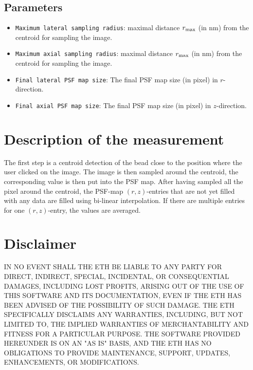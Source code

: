 \documentclass{scrartcl}
\begin{document}
\subsection{Parameters} 
\begin{itemize}
\item \texttt{Maximum lateral sampling radius}: maximal distance $r_{\textnormal{max}}$ (in nm) from the centroid for sampling the image.
\item \texttt{Maximum axial sampling radius}: maximal distance $r_{\textnormal{max}}$ (in nm) from the centroid for sampling the image.
\item \texttt{Final lateral PSF map size}: The final PSF map size (in pixel) in $r$-direction.
\item \texttt{Final axial PSF map size}: The final PSF map size (in pixel) in $z$-direction.
\end{itemize}

\section{Description of the measurement}
The first step is a centroid detection \cite{sbalzarini} of the bead close to the position where the user clicked on the image. 
The image is then sampled around the centroid, the corresponding value is then put into the PSF map.
After having sampled all the pixel around the centroid, the PSF-map $(r,z)$-entries that are not yet filled with any data are filled using bi-linear interpolation. If there are multiple entries for one $(r,z)$-entry, the values are averaged.

\section{Disclaimer}
IN NO EVENT SHALL THE ETH BE LIABLE TO ANY PARTY FOR DIRECT, INDIRECT, SPECIAL, INCIDENTAL, OR CONSEQUENTIAL DAMAGES, INCLUDING LOST PROFITS, ARISING OUT OF THE USE OF THIS SOFTWARE AND ITS DOCUMENTATION, EVEN IF THE ETH HAS BEEN ADVISED OF THE POSSIBILITY OF SUCH DAMAGE. THE ETH SPECIFICALLY DISCLAIMS ANY WARRANTIES, INCLUDING, BUT NOT LIMITED TO, THE IMPLIED WARRANTIES OF MERCHANTABILITY AND FITNESS FOR A PARTICULAR PURPOSE. THE SOFTWARE PROVIDED HEREUNDER IS ON AN "AS IS" BASIS, AND THE ETH HAS NO OBLIGATIONS TO PROVIDE MAINTENANCE, SUPPORT, UPDATES, ENHANCEMENTS, OR MODIFICATIONS.



\end{document}
